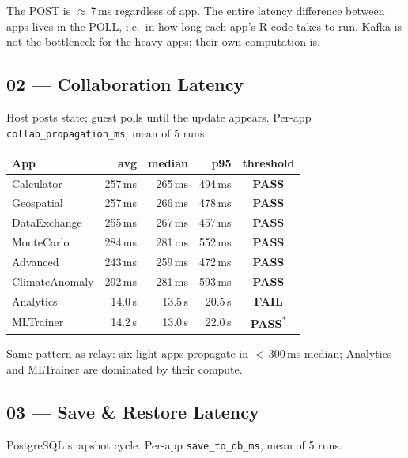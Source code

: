 \documentclass[11pt,a4paper]{article}
\newcommand{\pass}{\textcolor{pass}{\textbf{PASS}}}
\newcommand{\fail}{\textcolor{fail}{\textbf{FAIL}}}
\begin{document}
\medskip
\noindent The POST is $\approx$\,7\,ms regardless of app. The entire latency
difference between apps lives in the POLL, i.e.\ in how long each app's R code
takes to run. Kafka is not the bottleneck for the heavy apps; their own
computation is.

\subsection{02 — Collaboration Latency}

Host posts state; guest polls until the update appears.
Per-app \texttt{collab\_propagation\_ms}, mean of 5 runs.

\begin{tabular}{@{}lrrrc@{}}
\toprule
\textbf{App} & \textbf{avg} & \textbf{median} & \textbf{p95} & \textbf{threshold} \\
\midrule
Calculator      & 257\,ms & 265\,ms & 494\,ms & \pass \\
Geospatial      & 257\,ms & 266\,ms & 478\,ms & \pass \\
DataExchange    & 255\,ms & 267\,ms & 457\,ms & \pass \\
MonteCarlo      & 284\,ms & 281\,ms & 552\,ms & \pass \\
Advanced        & 243\,ms & 259\,ms & 472\,ms & \pass \\
ClimateAnomaly  & 292\,ms & 281\,ms & 593\,ms & \pass \\
Analytics       & 14.0\,s & 13.5\,s & 20.5\,s & \fail \\
MLTrainer       & 14.2\,s & 13.0\,s & 22.0\,s & \pass\textsuperscript{*} \\
\bottomrule
\end{tabular}

\medskip
\noindent Same pattern as relay: six light apps propagate in $<$\,300\,ms
median; Analytics and MLTrainer are dominated by their compute.

\subsection{03 — Save \& Restore Latency}

PostgreSQL snapshot cycle. Per-app \texttt{save\_to\_db\_ms}, mean of 5 runs.
\end{document}
